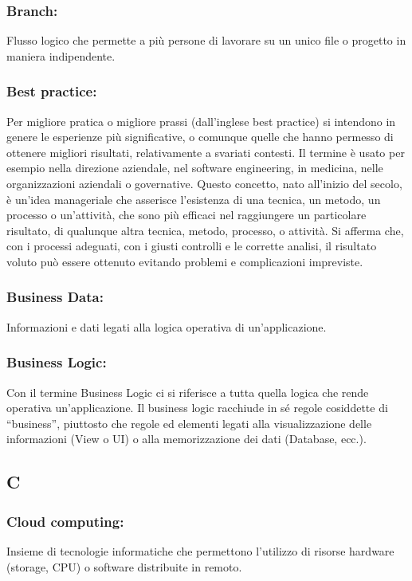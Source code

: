 \subsubsection*{Branch:} 
Flusso logico che permette a pi\`u persone di lavorare su un unico file o
progetto in maniera indipendente.

\subsubsection*{Best practice:}
Per migliore pratica o migliore prassi (dall'inglese best practice) si intendono
 in genere le esperienze pi\`u significative, o comunque quelle che hanno
 permesso di ottenere migliori risultati, relativamente a svariati contesti.
Il termine \`e usato per esempio nella direzione aziendale, nel software
engineering, in medicina, nelle organizzazioni aziendali o governative.
Questo concetto, nato all'inizio del secolo, \`e un'idea manageriale che
asserisce l'esistenza di una tecnica, un metodo, un processo o un'attivit\`a,
che sono pi\`u efficaci nel raggiungere un particolare risultato, di qualunque
altra tecnica, metodo, processo, o attivit\`a. Si afferma che, con i processi
adeguati, con i giusti controlli e le corrette analisi, il risultato voluto
pu\`o essere ottenuto evitando problemi e complicazioni impreviste.


\subsubsection*{Business Data:}
Informazioni e dati legati alla logica operativa di un'applicazione.

\subsubsection*{Business Logic:}
Con il termine Business Logic ci si riferisce a tutta quella logica che rende
operativa un'applicazione. Il business logic racchiude in s\'e regole cosiddette
di ``business'', piuttosto che regole ed elementi legati alla visualizzazione
delle informazioni (View o UI) o alla memorizzazione dei dati
(Database, ecc.).

\subsection*{\huge{C}}

\subsubsection*{Cloud computing:} Insieme di tecnologie informatiche che
permettono l'utilizzo di risorse hardware (storage, CPU) o software distribuite in remoto.

